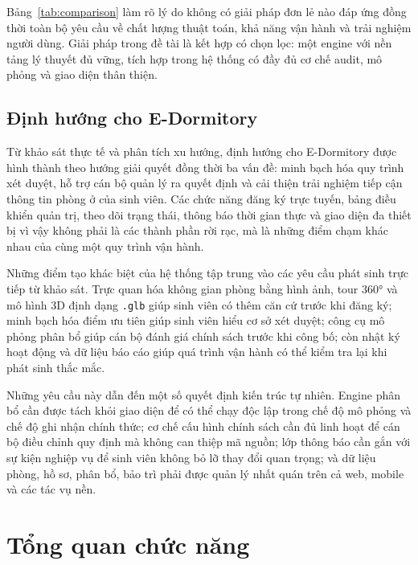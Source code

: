 \documentclass[../DoAn.tex]{subfiles}
\begin{document}
Bảng~\ref{tab:comparison} làm rõ lý do không có giải pháp đơn lẻ nào đáp ứng đồng thời toàn bộ yêu cầu về chất lượng thuật toán, khả năng vận hành và trải nghiệm người dùng. Giải pháp trong đề tài là kết hợp có chọn lọc: một engine với nền tảng lý thuyết đủ vững, tích hợp trong hệ thống có đầy đủ cơ chế audit, mô phỏng và giao diện thân thiện.

\subsection{Định hướng cho E-Dormitory}

Từ khảo sát thực tế và phân tích xu hướng, định hướng cho E-Dormitory được hình thành theo hướng giải quyết đồng thời ba vấn đề: minh bạch hóa quy trình xét duyệt, hỗ trợ cán bộ quản lý ra quyết định và cải thiện trải nghiệm tiếp cận thông tin phòng ở của sinh viên. Các chức năng đăng ký trực tuyến, bảng điều khiển quản trị, theo dõi trạng thái, thông báo thời gian thực và giao diện đa thiết bị vì vậy không phải là các thành phần rời rạc, mà là những điểm chạm khác nhau của cùng một quy trình vận hành.

Những điểm tạo khác biệt của hệ thống tập trung vào các yêu cầu phát sinh trực tiếp từ khảo sát. Trực quan hóa không gian phòng bằng hình ảnh, tour 360° và mô hình 3D định dạng \texttt{.glb} giúp sinh viên có thêm căn cứ trước khi đăng ký; minh bạch hóa điểm ưu tiên giúp sinh viên hiểu cơ sở xét duyệt; công cụ mô phỏng phân bổ giúp cán bộ đánh giá chính sách trước khi công bố; còn nhật ký hoạt động và dữ liệu báo cáo giúp quá trình vận hành có thể kiểm tra lại khi phát sinh thắc mắc.

Những yêu cầu này dẫn đến một số quyết định kiến trúc tự nhiên. Engine phân bổ cần được tách khỏi giao diện để có thể chạy độc lập trong chế độ mô phỏng và chế độ ghi nhận chính thức; cơ chế cấu hình chính sách cần đủ linh hoạt để cán bộ điều chỉnh quy định mà không can thiệp mã nguồn; lớp thông báo cần gắn với sự kiện nghiệp vụ để sinh viên không bỏ lỡ thay đổi quan trọng; và dữ liệu phòng, hồ sơ, phân bổ, bảo trì phải được quản lý nhất quán trên cả web, mobile và các tác vụ nền.

\section{Tổng quan chức năng}
\label{sec:functional}
\end{document}
